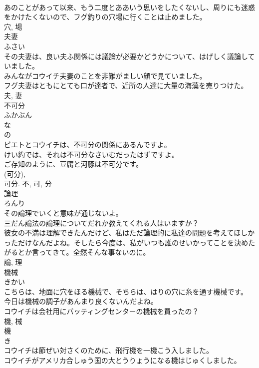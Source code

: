 \documentclass[8pt]{extreport}
\begin{document}
\begin{CJK}{UTF8}{min}
\\	あのことがあって以来、もう二度とああいう思いをしたくないし、周りにも迷惑をかけたくないので、フグ釣りの穴場に行くことは止めました。	
\\	穴, 場	
\\	夫妻	
\\	ふさい	
\\	その夫妻は、良い夫ふ関係には議論が必要かどうかについて、はげしく議論していました。	
\\	みんながコウイチ夫妻のことを非難がましい顔で見ていました。	
\\	フグ夫妻はともにとても口が達者で、近所の人達に大量の海藻を売りつけた。	
\\	夫, 妻	
\\	不可分	
\\	ふかぶん	
\\	な 
\\	の 
\\	ビエトとコウイチは、不可分の関係にあるんですよ。	
\\	けい約では、それは不可分なさいむだったはずですよ。	
\\	ご存知のように、豆腐と河豚は不可分です。	
\\	(可分), 
\\	可分.	不, 可, 分	
\\	論理	
\\	ろんり	
\\	その論理でいくと意味が通じないよ。	
\\	三だん論法の論理についてだれか教えてくれる人はいますか？	
\\	彼女の不満は理解できたんだけど、私はただ論理的に私達の問題を考えてほしかっただけなんだよね。そしたら今度は、私がいつも誰のせいかってことを決めたがるとか言ってきて。全然そんな事ないのに。	
\\	論, 理	
\\	機械	
\\	きかい	
\\	こちらは、地面に穴をほる機械で、そちらは、はりの穴に糸を通す機械です。	
\\	今日は機械の調子があんまり良くないんだよね。	
\\	コウイチは会社用にバッティングセンターの機械を買ったの？	
\\	機, 械	
\\	機	
\\	き	
\\	コウイチは節ぜい対さくのために、飛行機を一機こう入しました。	
\\	コウイチがアメリカ合しゅう国の大とうりょうになる機はじゅくしました。	

\end{CJK}
\end{document}

